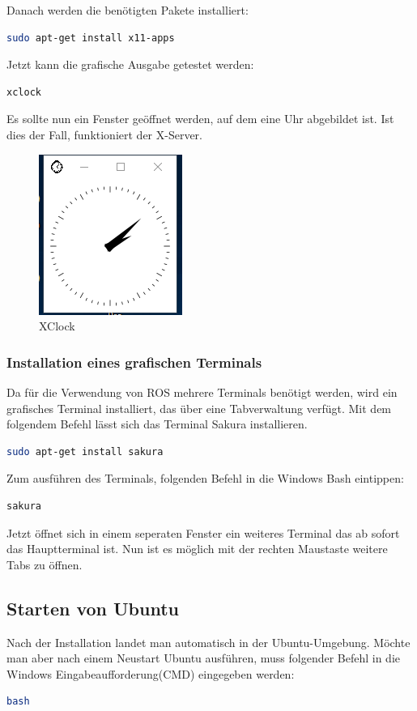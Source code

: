 Danach werden die benötigten Pakete installiert:
\begin{lstlisting}[language=bash]
sudo apt-get install x11-apps
\end{lstlisting}
Jetzt kann die grafische Ausgabe getestet werden:

\begin{lstlisting}[language=bash]
xclock
\end{lstlisting}
Es sollte nun ein Fenster geöffnet werden, auf dem eine Uhr abgebildet ist. Ist dies der Fall, funktioniert der X-Server.
\begin{figure}[H]
\centering
\includegraphics[scale=0.8]{Bilder/Clock.PNG}
\caption{XClock}
\label{fig:XClock}
\end{figure}

\subsubsection{Installation eines grafischen Terminals}
Da für die Verwendung von ROS mehrere Terminals benötigt werden, wird ein grafisches Terminal installiert, das über eine Tabverwaltung verfügt. Mit dem folgendem Befehl lässt sich das Terminal Sakura installieren.
\begin{lstlisting}[language=bash]
sudo apt-get install sakura
\end{lstlisting}
Zum ausführen des Terminals, folgenden Befehl in die Windows Bash eintippen:
\begin{lstlisting}[language=bash]
sakura
\end{lstlisting}
Jetzt öffnet sich in einem seperaten Fenster ein weiteres Terminal das ab sofort das Hauptterminal ist. Nun ist es möglich mit der rechten Maustaste weitere Tabs zu öffnen.



\subsection{Starten von Ubuntu}
Nach der Installation landet man automatisch in der Ubuntu-Umgebung. Möchte man aber nach einem Neustart Ubuntu ausführen, muss folgender Befehl in die Windows Eingabeaufforderung(CMD) eingegeben werden:
\begin{lstlisting}[language=bash]
bash
\end{lstlisting}


